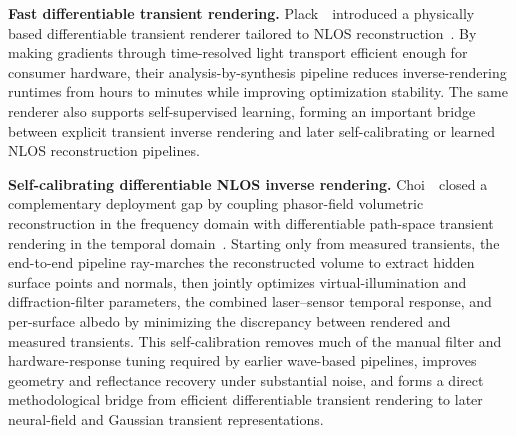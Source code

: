 \vspace{0.8mm}
\noindent \textbf{Fast differentiable transient rendering.}
Plack~\etal~introduced a physically based differentiable transient renderer tailored to NLOS reconstruction~\cite{plackFastDifferentiableTransient2023}. By making gradients through time-resolved light transport efficient enough for consumer hardware, their analysis-by-synthesis pipeline reduces inverse-rendering runtimes from hours to minutes while improving optimization stability. The same renderer also supports self-supervised learning, forming an important bridge between explicit transient inverse rendering and later self-calibrating or learned NLOS reconstruction pipelines.

\vspace{0.8mm}
\noindent \textbf{Self-calibrating differentiable NLOS inverse rendering.}
Choi~\etal~closed a complementary deployment gap by coupling phasor-field volumetric reconstruction in the frequency domain with differentiable path-space transient rendering in the temporal domain~\cite{choiSelfCalibratingNLOS2023}. Starting only from measured transients, the end-to-end pipeline ray-marches the reconstructed volume to extract hidden surface points and normals, then jointly optimizes virtual-illumination and diffraction-filter parameters, the combined laser--sensor temporal response, and per-surface albedo by minimizing the discrepancy between rendered and measured transients. This self-calibration removes much of the manual filter and hardware-response tuning required by earlier wave-based pipelines, improves geometry and reflectance recovery under substantial noise, and forms a direct methodological bridge from efficient differentiable transient rendering to later neural-field and Gaussian transient representations.

